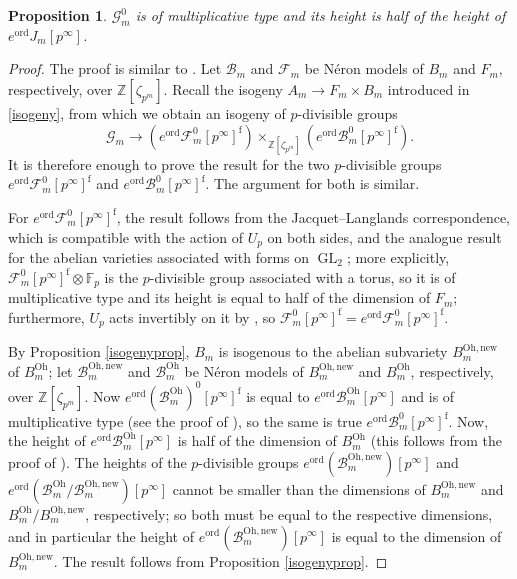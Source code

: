 \documentclass[a4paper,11pt]{amsart}
\numberwithin{equation}{section}
\theoremstyle{plain}
\newtheorem{proposition}[theorem]{Proposition}
\theoremstyle{definition}
\theoremstyle{remark}
\newcommand{\Z}{\mathbb{Z}}
\DeclareMathOperator{\GL}{GL}
\newcommand{\ord}{\mathrm{ord}}
\newcommand{\new}{\mathrm{new}}
\newcommand{\Oh}{\mathrm{Oh}}
\begin{document}
\begin{proposition}\label{multiplicativetype}
$\mathcal{G}_m^0$ is of multiplicative type and its height is half of the height of $e^\ord J_m[p^\infty]$. 
\end{proposition}

\begin{proof} The proof is similar to \cite[Proposition (1.2.4)]{OhtaMA}. Let $\mathcal{B}_m$ and $\mathcal{F}_m$ be Néron models of $B_m$ and $F_m$, respectively, over $\Z[\zeta_{p^m}]$. Recall the isogeny $A_m\rightarrow F_m\times B_m$ introduced in \eqref{isogeny}, from which we obtain an isogeny of $p$-divisible groups
\[\mathcal{G}_m\longrightarrow (e^\ord \mathcal{F}_m^0[p^\infty]^\mathrm{f})\times_{\Z[\zeta_{p^m}]}(e^\ord \mathcal{B}^0_m[p^\infty]^\mathrm{f}).\] It is therefore enough to prove the result for the two $p$-divisible groups 
$e^\ord \mathcal{F}_m^0[p^\infty]^\mathrm{f}$ and $e^\ord \mathcal{B}^0_m[p^\infty]^\mathrm{f}$. The argument for both is similar. 

For $e^\ord\mathcal{F}_m^0[p^\infty]^\mathrm{f}$, the result follows
from the Jacquet--Langlands correspondence, which is compatible with the action of $U_p$ on both sides, and the analogue result \cite[Proposition (1.2.4)]{OhtaMA} for the abelian varieties associated with forms on $\GL_2$; more explicitly, $\mathcal{F}_m^0[p^\infty]^\mathrm{f}\otimes\mathbb{F}_p$ is the $p$-divisible group associated with a torus, so it is of multiplicative type and its height is equal to half of the dimension of $F_m$; furthermore, $U_p$ acts invertibly on it by \cite[Lemma 3.2]{hida-measure}, so $\mathcal{F}_m^0[p^\infty]^\mathrm{f}=e^\ord \mathcal{F}_m^0[p^\infty]^\mathrm{f}$.  

By Proposition \ref{isogenyprop}, $B_m$ is isogenous to the abelian subvariety $B_m^{\Oh,\new}$ of $B_m^\Oh$; let $\mathcal{B}_m^{\Oh,\new}$ and $\mathcal{B}_m^\Oh$ be Néron models of $B_m^{\Oh,\new}$ and $B_m^\Oh$, respectively, over $\Z[\zeta_{p^m}]$. Now 
$e^\ord(\mathcal{B}_m^{\Oh})^0[p^\infty]^\mathrm{f}$ is equal to $e^\ord \mathcal{B}_m^{\Oh}[p^\infty]$ and is of multiplicative type (see the proof of \cite[Proposition (1.2.4)]{OhtaMA}), so the same is true $e^\ord \mathcal{B}^0_m[p^\infty]^\mathrm{f}$. 
Now, the height of $e^\ord \mathcal{B}_m^\Oh[p^\infty]$ is half of the dimension of $B_m^{\Oh}$ (this follows from the proof of \cite[Proposition (1.2.4)]{OhtaMA}). The heights of the $p$-divisible groups $e^\ord(\mathcal{B}_m^{\Oh,\new})[p^\infty]$ and $e^\ord(\mathcal{B}_m^{\Oh}/\mathcal{B}_m^{\Oh,\new})[p^\infty]$ cannot be smaller than the dimensions of $B_m^{\Oh,\new}$ and $B_m^{\Oh}/B_m^{\Oh,\new}$, respectively; so both must be equal to the respective dimensions, and in particular  
the height of $e^\ord(\mathcal{B}_m^{\Oh,\new})[p^\infty]$ is equal to the dimension of $B_m^{\Oh,\new}$. The result follows from Proposition \ref{isogenyprop}.
\end{proof}
\end{document}
